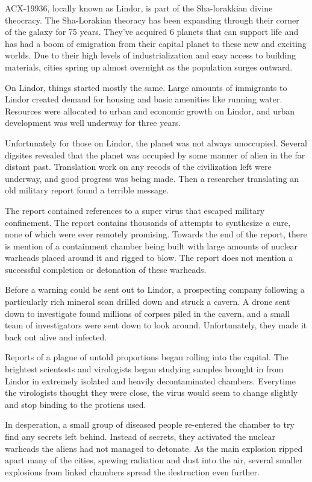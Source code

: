 ACX-19936, locally known as Lindor, is part of the Sha-lorakkian divine
theocracy. The Sha-Lorakian theoracy has been expanding through their corner
of the galaxy for 75 years. They've acquired 6 planets that can support life
and has had a boom of emigration from their capital planet to these new and
exciting worlds. Due to their high levels of industrialization and easy access
to building materials, cities spring up almost overnight as the population
surges outward.

On Lindor, things started mostly the same. Large amounts of immigrants to
Lindor created demand for housing and basic amenities like running water.
Resources were allocated to urban and economic growth on Lindor, and urban
development was well underway for three years.

Unfortunately for those on Lindor, the planet was not always unoccupied.
Several digsites revealed that the planet was occupied by some manner of alien
in the far distant past. Translation work on any recods of the civilization
left were underway, and good progress was being made. Then a researcher
translating an old military report found a terrible message.

The report contained references to a super virus that escaped military
confinement. The report contains thousands of attempts to synthesize a cure,
none of which were ever remotely promising. Towards the end of the report,
there is mention of a containment chamber being built with large amounts of
nuclear warheads placed around it and rigged to blow. The report does not
mention a successful completion or detonation of these warheads.

Before a warning could be sent out to Lindor, a prospecting company following
a particularly rich mineral scan drilled down and struck a cavern. A drone
sent down to investigate found millions of corpses piled in the cavern, and
a small team of investigators were sent down to look around. Unfortunately,
they made it back out alive and infected.

Reports of a plague of untold proportions began rolling into the capital. The
brightest scientests and virologists began studying samples brought in from
Lindor in extremely isolated and heavily decontaminated chambers. Everytime
the virologists thought they were close, the virus would seem to change
slightly and stop binding to the protiens used.

In desperation, a small group of diseased people re-entered the chamber to try
find any secrets left behind. Instead of secrets, they activated the nuclear
warheads the aliens had not managed to detonate. As the main explosion ripped
apart many of the cities, spewing radiation and dust into the air, several
smaller explosions from linked chambers spread the destruction even further.

